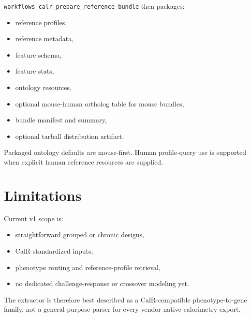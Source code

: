\documentclass[11pt]{article}
\begin{document}
\texttt{workflows calr\_prepare\_reference\_bundle} then packages:
\begin{itemize}[leftmargin=2em]
\item reference profiles,
\item reference metadata,
\item feature schema,
\item feature stats,
\item ontology resources,
\item optional mouse-human ortholog table for mouse bundles,
\item bundle manifest and summary,
\item optional tarball distribution artifact.
\end{itemize}

Packaged ontology defaults are mouse-first. Human profile-query use is supported when explicit human reference resources are supplied.

\section{Limitations}
Current v1 scope is:
\begin{itemize}[leftmargin=2em]
\item straightforward grouped or chronic designs,
\item CalR-standardized inputs,
\item phenotype routing and reference-profile retrieval,
\item no dedicated challenge-response or crossover modeling yet.
\end{itemize}

The extractor is therefore best described as a CalR-compatible phenotype-to-gene family, not a general-purpose parser for every vendor-native calorimetry export.
\end{document}
